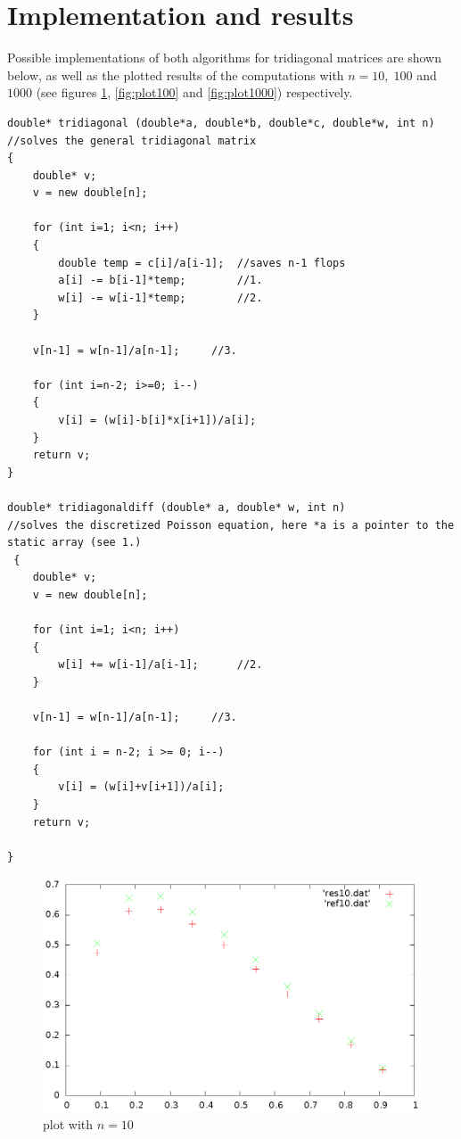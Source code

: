 \documentclass[11pt,a4wide]{article}
\begin{document}
\section{Implementation and results}
Possible implementations of both algorithms for tridiagonal matrices are shown below, as well as the plotted results of the computations with $n=10,\;100$ and $1000$ (see figures \ref{fig:plot10}, \ref{fig:plot100} and \ref{fig:plot1000}) respectively.
\begin{lstlisting}[title={solvers for tridiagonal matrices}]
double* tridiagonal (double*a, double*b, double*c, double*w, int n) 	//solves the general tridiagonal matrix
{
    double* v;
    v = new double[n];

    for (int i=1; i<n; i++)
    {
        double temp = c[i]/a[i-1];	//saves n-1 flops
        a[i] -= b[i-1]*temp;		//1.
        w[i] -= w[i-1]*temp;		//2.
    }

    v[n-1] = w[n-1]/a[n-1];		//3.		

    for (int i=n-2; i>=0; i--)
    {
        v[i] = (w[i]-b[i]*x[i+1])/a[i];
    }
    return v;
}

double* tridiagonaldiff (double* a, double* w, int n)	
//solves the discretized Poisson equation, here *a is a pointer to the static array (see 1.)
 {
    double* v;
    v = new double[n];

    for (int i=1; i<n; i++)
    {
        w[i] += w[i-1]/a[i-1];		//2.
    }

    v[n-1] = w[n-1]/a[n-1];		//3.

    for (int i = n-2; i >= 0; i--)
    {
        v[i] = (w[i]+v[i+1])/a[i];
    }
    return v;

}
\end{lstlisting}
\begin{figure}[H]
	\centering
\includegraphics[scale=0.5,angle=-90]{plot10.eps}
\caption{plot with $n=10$}
	\label{fig:plot10}
\end{figure}
\end{document}
